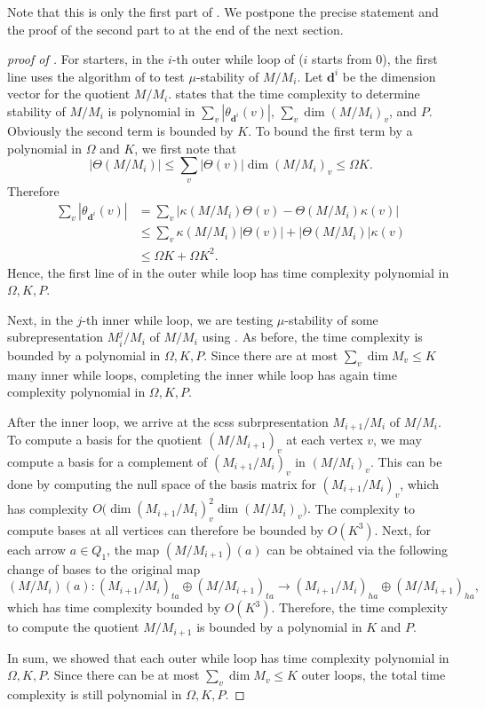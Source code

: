 \documentclass[a4paper]{amsart}
\numberwithin{equation}{section}
\theoremstyle{plain}
\theoremstyle{definition}
\begin{document}
Note that this is only the first part of . We postpone the precise statement and the proof of the second part to  at the end of the next section.
\begin{proof}[proof of ]
For starters, in the $i$-th outer while loop of  ($i$ starts from 0), the first line uses the algorithm of  to test $\mu$-stability of $M/M_{i}$. Let $\mathbf{d}^{i}$ be the dimension vector for the quotient $M/M_{i}$.  states that the time complexity to determine stability of $M/M_i$ is polynomial in $\sum_{v}|\theta_{\mathbf{d}^i}(v)|$, $\sum_{v}\dim (M/M_i)_{v}$, and $P$. Obviously the second term is bounded by $K$. To bound the first term by a polynomial in $\Omega$ and $K$, we first note that 
$$|\Theta(M/M_i)|\leq\sum_{v}|\Theta(v)|\dim(M/M_i)_v\leq \Omega K.$$ Therefore \begin{equation*}
\begin{split}
    \sum_v|\theta_{\mathbf{d}^{i}}(v)|&=\sum_v|\kappa(M/M_i)\Theta(v)-\Theta(M/M_i)\kappa(v)|\\
    &\leq \sum_v \kappa(M/M_i)|\Theta(v)|+|\Theta(M/M_i)|\kappa(v)\\
    &\leq \Omega K+\Omega K^2.
    \end{split}
\end{equation*} 
Hence, the first line of  in the outer while loop has time complexity polynomial in $\Omega,K,P$. 

Next, in the $j$-th inner while loop, we are testing $\mu$-stability of some subrepresentation $M^{j}_i/M_i$ of $M/M_i$ using . As before, the time complexity is bounded by a polynomial in $\Omega,K,P.$ Since there are at most $\sum_v\dim M_v\leq K$ many inner while loops, completing the inner while loop has again time complexity polynomial in $\Omega,K,P$. 

After the inner loop, we arrive at the scss subrpresentation $M_{i+1}/M_{i}$ of $M/M_{i}$. To compute a basis for the quotient $(M/M_{i+1})_v$ at each vertex $v$, we may compute a basis for a complement of $(M_{i+1}/M_{i})_v$ in $(M/M_{i})_v$. This can be done by computing the null space of the basis matrix for $(M_{i+1}/M_{i})_v$, which has complexity $O\big(\dim (M_{i+1}/M_i)_v^2\dim (M/M_i)_v\big).$ The complexity to compute bases at all vertices can therefore be bounded by $O(K^3)$. Next, for each arrow $a\in Q_1$, the map $(M/M_{i+1})(a)$ can be obtained via the following change of bases to the original map 
$$(M/M_{i})(a):(M_{i+1}/M_{i})_{ta}\oplus (M/M_{i+1})_{ta}\rightarrow (M_{i+1}/M_{i})_{ha}\oplus(M/M_{i+1})_{ha},$$ which has time complexity bounded by $O(K^3)$. Therefore, the time complexity to compute the quotient $M/M_{i+1}$ is bounded by a polynomial in $K$ and $P.$ 

In sum, we showed that each outer while loop has time complexity polynomial in $\Omega,K,P$. Since there can be at most $\sum_{v}\dim M_v\leq K$ outer loops, the total time complexity is still polynomial in $\Omega,K,P$.
\end{proof}
\end{document}
